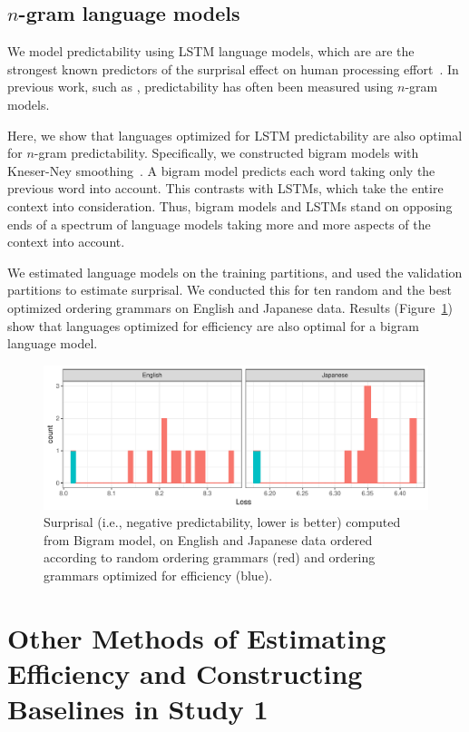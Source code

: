 \documentclass[10pt,twoside,lineno]{article}
\begin{document}
\subsection{$n$-gram language models}

We model predictability using LSTM language models, which are are the strongest known predictors of the surprisal effect on human processing effort~\citep{frank2011insensitivity,goodkind2018predictive}.
In previous work, such as \cite{gildea2015human}, predictability has often been measured using $n$-gram models.

Here, we show that languages optimized for LSTM predictability are also optimal for $n$-gram predictability.
Specifically, we constructed bigram models with Kneser-Ney smoothing~\cite{kneser1995improved, chen1999empirical}.
A bigram model predicts each word taking only the previous word into account.
This contrasts with LSTMs, which take the entire context into consideration.
Thus, bigram models and LSTMs stand on opposing ends of a spectrum of language models taking more and more aspects of the context into account.

We estimated language models on the training partitions, and used the validation partitions to estimate surprisal.
We conducted this for ten random and the best optimized ordering grammars on English and Japanese data.
Results (Figure~\ref{fig:bigrams}) show that languages optimized for efficiency are also optimal for a bigram language model.

\begin{figure}
    \centering
    \includegraphics[scale=.6]{../results/bigrams/bigrams.pdf} 
	\caption{Surprisal (i.e., negative predictability, lower is better) computed from Bigram model, on English and Japanese data ordered according to random ordering grammars (red) and ordering grammars optimized for efficiency (blue).}
    \label{fig:bigrams}
\end{figure}



\section{Other Methods of Estimating Efficiency and Constructing Baselines in Study 1}
\end{document}
